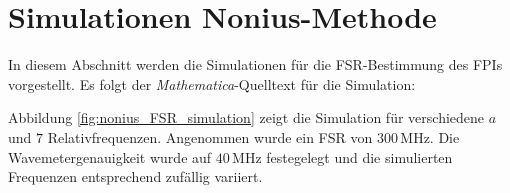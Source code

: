 \section{Simulationen Nonius-Methode}\label{anh:sec:nonius_simulationen}
In diesem Abschnitt werden die Simulationen für die FSR-Bestimmung des FPIs
vorgestellt. Es folgt der \textit{Mathematica}-Quelltext für die Simulation:
\lstset{language=Mathematica}

Abbildung \ref{fig:nonius_FSR_simulation} zeigt die Simulation für verschiedene
$a$ und $7$ Relativfrequenzen. Angenommen wurde ein FSR von $300\,$MHz. Die
Wavemetergenauigkeit wurde auf $40\,$MHz festegelegt und die simulierten
Frequenzen entsprechend zufällig variiert.
\begin{figure}[h]
 	\centering
\end{figure}
